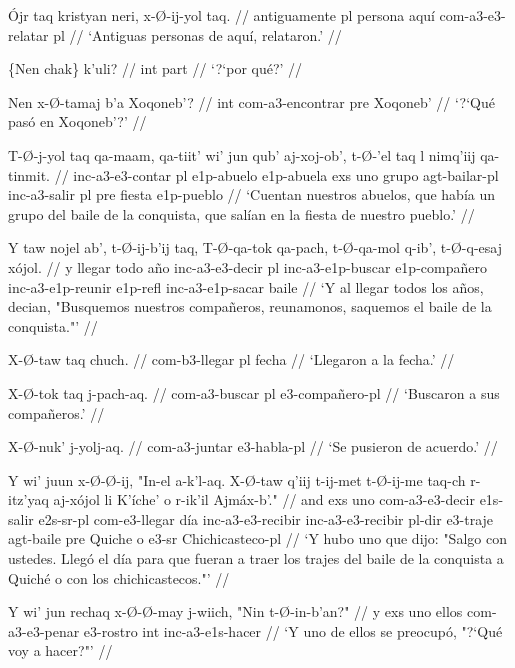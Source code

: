 \documentclass[12pt]{article}
\begin{document}
\ex
\begingl
  \gla \'Ojr taq kristyan neri, x-\O-ij-yol taq. //
  \glb  antiguamente pl persona aqu\'i com-a3-e3-relatar pl //
  \glft `Antiguas personas de aqu\'i, relataron.' //
\endgl
\xe


\ex
\begingl
  \gla  \{Nen chak\} k'uli? //
  \glb int part //
  \glft `?`por qu\'e?' //
\endgl
\xe

\ex
\begingl
  \gla  Nen x-\O-tamaj b'a Xoqoneb'? //
  \glb int com-a3-encontrar pre Xoqoneb' //
  \glft `?`Qu\'e pas\'o en Xoqoneb'?' //
\endgl
\xe

\ex
\begingl
  \gla  T-\O-j-yol taq qa-maam, qa-tiit' wi' jun qub' aj-xoj-ob', t-\O-'el taq l nimq'iij qa-tinmit. //
  \glb  inc-a3-e3-contar pl e1p-abuelo e1p-abuela exs uno grupo agt-bailar-pl inc-a3-salir pl pre fiesta e1p-pueblo //
  \glft `Cuentan nuestros abuelos, que hab\'ia un grupo del baile de la conquista, que sal\'ian en la fiesta de nuestro pueblo.' //
\endgl
\xe

\ex
\begingl
  \gla  Y taw nojel ab', t-\O-ij-b'ij taq, T-\O-qa-tok qa-pach, t-\O-qa-mol q-ib', t-\O-q-esaj x\'ojol. //
  \glb  y llegar todo a\~no inc-a3-e3-decir pl inc-a3-e1p-buscar e1p-compa\~nero inc-a3-e1p-reunir e1p-refl inc-a3-e1p-sacar baile //
  \glft `Y al llegar todos los a\~nos, decian, "Busquemos nuestros compa\~neros, reunamonos, saquemos el baile de la conquista."' //
\endgl
\xe


\ex
\begingl
  \gla  X-\O-taw taq chuch. //
  \glb com-b3-llegar pl fecha //
  \glft `Llegaron a la fecha.' //
\endgl
\xe

\ex
\begingl
  \gla  X-\O-tok taq j-pach-aq. //
  \glb com-a3-buscar pl e3-compa\~nero-pl //
  \glft `Buscaron a sus compa\~neros.' //
\endgl
\xe

\ex
\begingl
  \gla  X-\O-nuk' j-yolj-aq. //
  \glb  com-a3-juntar e3-habla-pl //
  \glft `Se pusieron de acuerdo.' //
\endgl
\xe

\ex
\begingl
  \gla Y wi' juun x-\O-\O-ij, "In-el a-k'l-aq. X-\O-taw q'iij t-ij-met t-\O-ij-me taq-ch r-itz'yaq aj-x\'ojol li K'\'iche' o r-ik'il Ajm\'ax-b'." //
  \glb and exs uno com-a3-e3-decir e1s-salir e2s-sr-pl com-e3-llegar d\'ia inc-a3-e3-recibir inc-a3-e3-recibir pl-dir e3-traje agt-baile pre Quiche o e3-sr Chichicasteco-pl //
  \glft `Y hubo uno que dijo: "Salgo con ustedes. Lleg\'o el d\'ia para que fueran a traer los trajes del baile de la conquista a Quich\'e o con los chichicastecos."' //
\endgl
\xe

\ex
\begingl
  \gla  Y wi' jun rechaq x-\O-\O-may j-wiich, "Nin t-\O-in-b'an?" //
  \glb y exs uno ellos com-a3-e3-penar e3-rostro int inc-a3-e1s-hacer //
  \glft `Y uno de ellos se preocup\'o, "?`Qu\'e voy a hacer?"' //
\endgl
\xe
\end{document}

